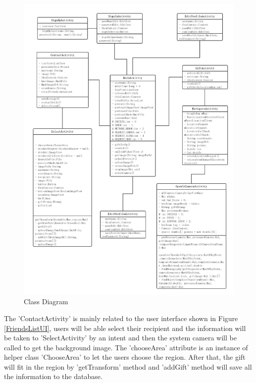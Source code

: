 \begin{figure}[H]
\centering
\includegraphics[width=.9\textwidth]{section03/assets/ClassDiagram.png}
\caption[Short Caption 2]{\label{ClassDiagram}Class Diagram}
\end{figure}
\par The 'ContactActivity' is mainly related to the user interface shown in Figure \ref{FriendsListUI}, users will be able select their recipient and the information will be taken to 'SelectActivity' by an intent and then the system camera will be called to get the background image. The 'chooseArea' attribute is an instance of helper class 'ChooseArea' to let the users choose the region. After that, the gift will fit in the region by 'getTransform' method and 'addGift' method will save all the information to the database.
